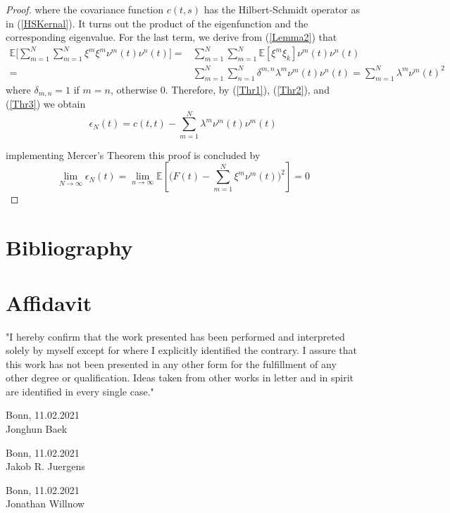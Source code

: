 \documentclass[11pt,twoside,a4paper]{article}
\begin{document}
\begin{proof}
		where the covariance function $c(t,s)$ has the Hilbert-Schmidt operator as in (\ref{HSKernal}). It turns out the product of the eigenfunction and the corresponding eigenvalue. For the last term, we derive from (\ref{Lemma2}) that
		\begin{equation}\label{Thr3}
			\begin{split}
				\mathbb{E}\bigg[\sum_{m=1}^{N} \sum_{m=1}^{N} \xi^m \xi^m \nu^m(t) \nu^n(t)\bigg] = & \sum_{m=1}^{N} \sum_{m=1}^{N} \mathbb{E}[\xi^m \xi_{k}] \nu^m(t) \nu^n(t)\\
				= & \sum_{m=1}^{N} \sum_{n=1}^{N} \delta^{m,n} \lambda^m \nu^m(t) \nu^n(t) = 		\sum_{m=1}^{N} \lambda^m \nu^m(t)^{2}
			\end{split}	
		\end{equation}
		where $\delta_{m,n} = 1$ if $m=n$, otherwise 0. Therefore, by (\ref{Thr1}), (\ref{Thr2}), and (\ref{Thr3}) we obtain
		\begin{equation}
			\epsilon_{N}(t) = c(t,t) - \sum_{m=1}^{N} \lambda^m \nu^m(t) \nu^m(t)
		\end{equation}
		
		implementing Mercer's Theorem this proof is concluded by
		\begin{equation}
			\lim\limits_{N \rightarrow \infty} \epsilon_{N}(t) = \lim\limits_{n \rightarrow \infty} \mathbb{E} \left[\bigg( F(t) - \sum_{m=1}^{N} \xi^m \nu^m(t)\bigg)^2 \right] = 0
		\end{equation}
	\end{proof}

	\newpage
	
	\section{Bibliography}
	\printbibliography[heading=none]	
	
	\newpage
	\section{Affidavit}
	
	\vspace{2cm}
	"I hereby confirm that the work presented has been performed and
	interpreted solely by myself except for where I explicitly identified the
	contrary. I assure that this work has not been presented in any other
	form for the fulfillment of any other degree or qualification. Ideas
	taken from other works in letter and in spirit are identified in every
	single case."
	
	\vspace{2cm}
	Bonn, 11.02.2021 \hrulefill \\
	\hspace*{0mm}Jonghun Baek
	
	\vspace{2cm}
	Bonn, 11.02.2021 \hrulefill \\
	\hspace*{0mm}Jakob R. Juergens
	
	\vspace{2cm}
	Bonn, 11.02.2021 \hrulefill \\
	\hspace*{0mm}Jonathan Willnow
	
	
\end{document}
